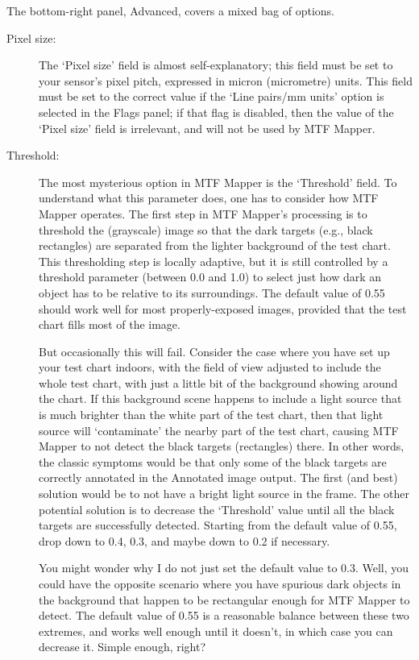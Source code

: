 \documentclass[a4paper]{article}
\begin{document}
The bottom-right panel, \textsf{Advanced}, covers a mixed bag of options.
\begin{description}
\item[Pixel size:]
The `Pixel size' field is almost self-explanatory; this field must be set to
your sensor's pixel pitch, expressed in micron (micrometre) units. This
field must be set to the correct value if the `Line pairs/mm units' option
is selected in the \textsf{Flags} panel; if that flag is disabled, then the
value of the `Pixel size' field is irrelevant, and will not be used by MTF
Mapper.

\item[Threshold:]
The most mysterious option in MTF Mapper is the `Threshold' field. To
understand what this parameter does, one has to consider how MTF Mapper
operates. The first step in MTF Mapper's processing is to threshold the
(grayscale) image so that the dark targets (e.g., black rectangles) are
separated from the lighter background of the test chart. This thresholding
step is locally adaptive, but it is still controlled by a threshold
parameter (between 0.0 and 1.0) to select just how dark an object has to be
relative to its surroundings. The default value of 0.55 should work well for
most properly-exposed images, provided that the test chart fills most of the
image.

But occasionally this will fail. Consider the case where you have set up
your test chart indoors, with the field of view adjusted to include the
whole test chart, with just a little bit of the background showing around
the chart. If this background scene happens to include a light source that
is much brighter than the white part of the test chart, then that light
source will `contaminate' the nearby part of the test chart, causing MTF
Mapper to not detect the black targets (rectangles) there. In other words,
the classic symptoms would be that only some of the black targets are
correctly annotated in the \textsf{Annotated image} output. The first (and
best) solution would be to not have a bright light source in the frame. 
The other potential solution is to decrease the `Threshold'
value until all the black targets are successfully detected. Starting from
the default value of 0.55, drop down to 0.4, 0.3, and maybe down to 0.2 if
necessary. 

You might wonder why I do not just set the default value to 0.3. Well, you
could have the opposite scenario where you have spurious dark objects in the
background that happen to be rectangular enough for MTF Mapper to detect.
The default value of 0.55 is a reasonable balance between these two
extremes, and works well enough until it doesn't, in which case you can
decrease it. Simple enough, right?


\end{description}
\end{document}
